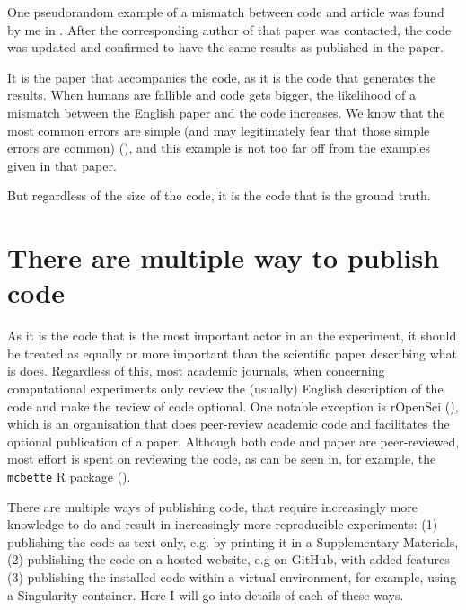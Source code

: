 One pseudorandom example of a mismatch between code and article
was found by me in \cite{labrecque2019interpretation}.
After the corresponding author of that paper was contacted,
the code was updated and confirmed to have the same
results as published in the paper.

It is the paper that accompanies the code,
as it is the code that generates the results.
When humans are fallible and code gets bigger, the likelihood of
a mismatch between the English paper and the code increases.
We know that the most common errors are 
simple (and may legitimately fear that those simple errors are common) 
(\cite{baggerly2009deriving}),
and this example is not too far off from the
examples given in that paper.

But regardless of the size of the code, 
it is the code that is the ground truth.

\section{There are multiple way to publish code}

As it is the code that is the most important actor in an the experiment,
it should be treated as equally or more important than the scientific
paper describing what is does.
Regardless of this, most academic journals, 
when concerning computational experiments
only review the (usually) English description of the code
and make the review of code optional.
One notable exception is rOpenSci (\cite{ram2018community}),
which is an organisation that does peer-review academic code 
and facilitates the optional publication of a paper.
Although both code and paper are peer-reviewed,
most effort is spent on reviewing the code,
as can be seen in, for example, 
the \verb|mcbette| R package (\cite{bilderbeek2020mcbette}).

There are multiple ways of publishing code,
that require increasingly more knowledge to do and result
in increasingly more reproducible experiments:
(1) publishing the code as text only, e.g. by printing
it in a Supplementary Materials, (2) publishing
the code on a hosted website, e.g on GitHub, with
added features (3) publishing 
the installed code within a virtual environment,
for example, using a Singularity container.
Here I will go into details of each of these ways.

